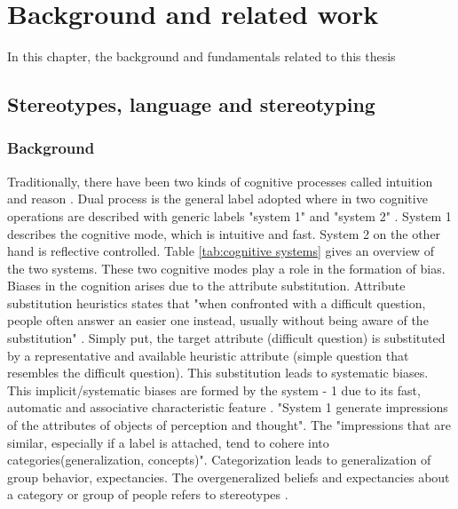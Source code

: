 \chapter{Background and related work}

In this chapter, the background and fundamentals related to this thesis
\section{Stereotypes, language and stereotyping}
\subsection{Background}

Traditionally, there have been two kinds of cognitive processes called intuition and reason \cite{kahneman2002representativeness}. Dual process is the general label adopted where in two cognitive operations are described with generic labels "system 1" and "system 2" \cite{kahneman2002representativeness}. System 1 describes the cognitive mode, which is intuitive and fast. System 2 on the other hand is reflective  controlled. Table \ref{tab:cognitive systems} gives an overview of the two systems. These two cognitive modes play a role in the formation of bias. Biases in the cognition arises due to the attribute substitution. Attribute substitution heuristics states that "when confronted with a difficult question, people often answer an easier one instead, usually
without being aware of the substitution" \cite{kahneman2002representativeness}. Simply put, the target attribute (difficult question) is substituted by a representative and available heuristic attribute (simple question that resembles the difficult question). This substitution leads to systematic biases. This implicit/systematic biases are formed by the system - 1 due to its fast, automatic and associative characteristic feature \cite{kahneman2002representativeness}. "System 1 generate impressions of the attributes of objects of perception and thought"\cite{kahneman2003maps}. The "impressions that are similar, especially if a label is attached, tend to cohere into categories(generalization, concepts)"\cite{fiske1998stereotyping}. Categorization leads to generalization of group behavior, expectancies. The overgeneralized beliefs and expectancies about a category or group of people refers to stereotypes \cite{allport1954nature}\cite{fiske1998stereotyping}. 

